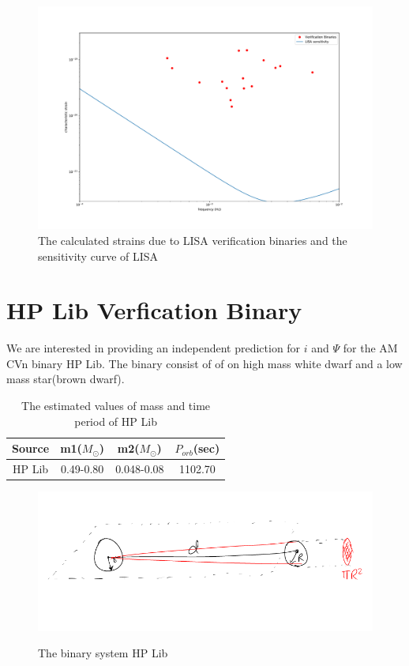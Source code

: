 \documentclass[10pt,a4paper]{article}
\begin{document}
\begin{figure}[ht]
\centering
\includegraphics[scale=0.25]{../Figures/strain_verific_binary.pdf}
\caption{The calculated strains due to LISA verification binaries and the sensitivity curve of LISA}
\end{figure}
\section*{HP Lib Verfication Binary}

We are interested in providing an independent prediction for $i$ and $\Psi$ for the AM CVn binary HP Lib. The binary consist of of on high mass white dwarf and a low mass star(brown dwarf).\\

\begin{table}[H]
\centering
\begin{tabular}{|c|c|c|c|}
\hline 
\rule[-1ex]{0pt}{2.5ex} Source & m1($M_{\odot}$) & m2($M_{\odot}$) & $P_{orb}$(sec) \\ 
\hline 
\rule[-1ex]{0pt}{2.5ex} HP Lib & 0.49-0.80 & 0.048-0.08 & 1102.70 \\ 
\hline 
\end{tabular}
\caption{The estimated values of mass and time period of HP Lib}
\end{table}

\begin{figure}[ht]
\centering
\includegraphics[scale=0.5]{diagram1.png}
\label{1}
\caption{The binary system HP Lib}
\end{figure}
\end{document}
